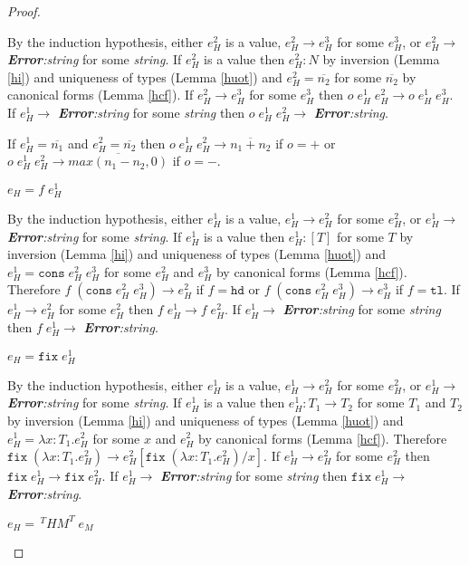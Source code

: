\begin{hps}
\begin{proof}
\begin{hps-case-10}
By the induction hypothesis, either $e_{H}^{2}$ is a value, $e_{H}^{2}\rightarrow e_{H}^{3}$ for some $e_{H}^{3}$, or $e_{H}^{2}\rightarrow$ \emph{\textbf{Error}:\;string} for some \emph{string}.  If $e_{H}^{2}$ is a value then $e_{H}^{2}:N$ by inversion (Lemma \ref{hi}) and uniqueness of types (Lemma \ref{huot}) and $e_{H}^{2}=\overline{n_{2}}$ for some $\overline{n_{2}}$ by canonical forms (Lemma \ref{hcf}).  If $e_{H}^{2}\rightarrow e_{H}^{3}$ for some $e_{H}^{3}$ then $o\;e_{H}^{1}\;e_{H}^{2}\rightarrow o\;e_{H}^{1}\;e_{H}^{3}$.  If $e_{H}^{1}\rightarrow$ \emph{\textbf{Error}:\;string} for some \emph{string} then $o\;e_{H}^{1}\;e_{H}^{2}\rightarrow$ \emph{\textbf{Error}:\;string}.

If $e_{H}^{1}=\overline{n_{1}}$ and $e_{H}^{2}=\overline{n_{2}}$ then $o\;e_{H}^{1}\;e_{H}^{2}\rightarrow \overline{n_{1}+n_{2}}$ if $o=+$ or $o\;e_{H}^{1}\;e_{H}^{2}\rightarrow \overline{max(n_{1}-n_{2},0)}$ if $o=-$.
\end{hps-case-10}
\begin{hps-case-11}
$e_{H}=f\;e_{H}^{1}$

By the induction hypothesis, either $e_{H}^{1}$ is a value, $e_{H}^{1}\rightarrow e_{H}^{2}$ for some $e_{H}^{2}$, or $e_{H}^{1}\rightarrow$ \emph{\textbf{Error}:\;string} for some \emph{string}.  If $e_{H}^{1}$ is a value then $e_{H}^{1}:[T]$ for some $T$ by inversion (Lemma \ref{hi}) and uniqueness of types (Lemma \ref{huot}) and $e_{H}^{1}=\mathtt{cons}\;e_{H}^{2}\;e_{H}^{3}$ for some $e_{H}^{2}$ and $e_{H}^{3}$ by canonical forms (Lemma \ref{hcf}).  Therefore $f\;(\mathtt{cons}\;e_{H}^{2}\;e_{H}^{3})\rightarrow e_{H}^{2}$ if $f=\mathtt{hd}$ or $f\;(\mathtt{cons}\;e_{H}^{2}\;e_{H}^{3})\rightarrow e_{H}^{3}$ if $f=\mathtt{tl}$.  If $e_{H}^{1}\rightarrow e_{H}^{2}$ for some $e_{H}^{2}$ then $f\;e_{H}^{1}\rightarrow f\;e_{H}^{2}$.  If $e_{H}^{1}\rightarrow$ \emph{\textbf{Error}:\;string} for some \emph{string} then $f\;e_{H}^{1}\rightarrow$ \emph{\textbf{Error}:\;string}.
\end{hps-case-11}
\begin{hps-case-12}
$e_{H}=\mathtt{fix}\;e_{H}^{1}$

By the induction hypothesis, either $e_{H}^{1}$ is a value, $e_{H}^{1}\rightarrow e_{H}^{2}$ for some $e_{H}^{2}$, or $e_{H}^{1}\rightarrow$ \emph{\textbf{Error}:\;string} for some \emph{string}.  If $e_{H}^{1}$ is a value then $e_{H}^{1}:T_{1}\rightarrow T_{2}$ for some $T_{1}$ and $T_{2}$ by inversion (Lemma \ref{hi}) and uniqueness of types (Lemma \ref{huot}) and $e_{H}^{1}=\lambda x:T_{1}.e_{H}^{2}$ for some $x$ and $e_{H}^{2}$ by canonical forms (Lemma \ref{hcf}).  Therefore $\mathtt{fix}\;(\lambda x:T_{1}.e_{H}^{2})\rightarrow e_{H}^{2}[\mathtt{fix}\;(\lambda x:T_{1}.e_{H}^{2})/x]$.  If $e_{H}^{1}\rightarrow e_{H}^{2}$ for some $e_{H}^{2}$ then $\mathtt{fix}\;e_{H}^{1}\rightarrow\mathtt{fix}\;e_{H}^{2}$.  If $e_{H}^{1}\rightarrow$ \emph{\textbf{Error}:\;string} for some \emph{string} then $\mathtt{fix}\;e_{H}^{1}\rightarrow$ \emph{\textbf{Error}:\;string}.
\end{hps-case-12}
\begin{hps-case-12}
$e_{H}=\,^{T}HM^{T}\;e_{M}$



\end{hps-case-12}
\end{proof}
\end{hps}
